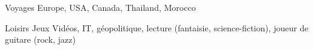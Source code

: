
\begin{cvskills}

\cvskill
{Voyages} %
{Europe, USA, Canada, Thailand, Morocco}


\cvskill
{Loisirs} %
{Jeux Vidéos, IT, géopolitique, lecture (fantaisie, science-fiction), joueur de guitare (rock, jazz)}

\end{cvskills}
